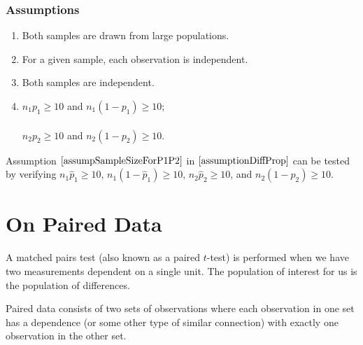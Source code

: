 \subsubsection{Assumptions}

\begin{assumptions}
\label{assumptionDiffProp}
\begin{enumerate}
\item Both samples are drawn from large populations.
\item For a given sample, each observation is independent.
\item Both samples are independent.
\item	$n_{1} p_{1} \geq 10$ and $n_{1} (1-p_{1}) \geq 10$; \label{assumpSampleSizeForP1P2}\\
	\hfill\\
	$n_{2} p_{2} \geq 10$ and $n_{2} (1-p_{2}) \geq 10$.
	\vspace{0.25cm}
\end{enumerate}
\end{assumptions}


\begin{nt}
Assumption $\ref{assumpSampleSizeForP1P2}$
in $\ref{assumptionDiffProp}$ can be tested by verifying 
$n_{1} \hat{p}_{1} \geq 10$, $n_{1} (1 - \hat{p}_{1}) \geq 10$, $n_{2} \hat{p}_{2} \geq 10$, and $n_{2} (1 - \hat{p}_{2}) \geq 10$.
\end{nt}


















\section{On Paired Data}


A matched pairs test (also known as a {paired $t$-test}) is performed when we have two measurements dependent on a single unit.
The population of interest for us is the population of differences.

\begin{definition}	
Paired data consists of two sets of observations where each observation in one set has a dependence (or some other type of similar connection) with exactly one observation in the other set.
\end{definition}

